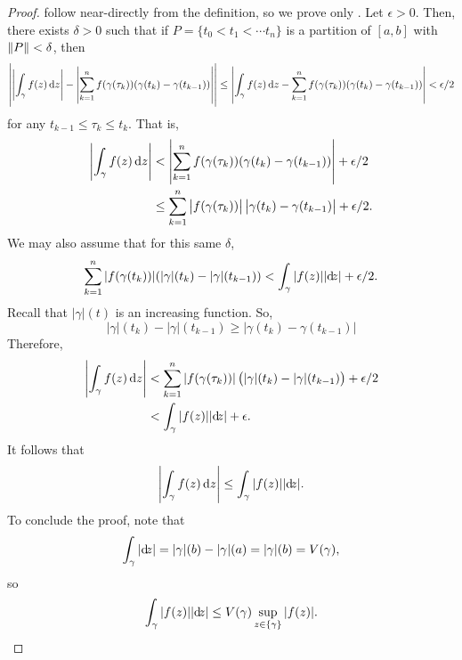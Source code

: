 	\begin{proof}
		 follow near-directly from the definition, so we prove only . Let $\epsilon > 0$. Then, there exists $\delta > 0$ such that if $P = \{ t_0 < t_1 < \cdots t_n \}$ is a partition of $[a,b]$ with $\left\lVert P\right\rVert < \delta$, then
		\[ \left| \left| \int_\gamma f(z) \dif z \right| - \left| \sum_{k=1}^n f(\gamma(\tau_k)) (\gamma(t_k) - \gamma(t_{k-1})) \right| \right| \le \left| \int_\gamma f(z) \dif z - \sum_{k=1}^n f(\gamma(\tau_k)) (\gamma(t_k) - \gamma(t_{k-1})) \right| < \epsilon/2 \]
		for any $t_{k-1} \le \tau_k \le t_k$.
		That is,
		\begin{align*}
			\left| \int_\gamma f(z) \dif z \right| &< \left| \sum_{k=1}^n f(\gamma(\tau_k)) (\gamma(t_k) - \gamma(t_{k-1})) \right| + \epsilon/2 \\
			&\le  \sum_{k=1}^n \left| f(\gamma(\tau_k)) \right| \left|\gamma(t_k) - \gamma(t_{k-1}) \right| + \epsilon/2.
		\end{align*}
		We may also assume that for this same $\delta$,
		\[ \sum_{k=1}^n |f(\gamma(t_k))| (|\gamma|(t_k) - |\gamma|(t_{k-1})) < \int_\gamma |f(z)| |{\dif} {z}| + \epsilon/2 . \]
		Recall that $|\gamma|(t)$ is an increasing function. So,
		\[ |\gamma|(t_k) - |\gamma|(t_{k-1}) \ge |\gamma(t_k) - \gamma(t_{k-1})| \]
		Therefore,
		\begin{align*}
			\left| \int_\gamma f(z) \dif z \right| &< \sum_{k=1}^n |f(\gamma(\tau_k))| \left( |\gamma|(t_k) - |\gamma|(t_{k-1}) \right) + \epsilon/2 \\
				&< \int_\gamma |f(z)| |{\dif} {z}| + \epsilon.
		\end{align*}
		It follows that
		\[ \left| \int_\gamma f(z) \dif z \right| \le \int_\gamma |f(z)| |{\dif} {z}|. \]
		To conclude the proof, note that
		\[ \int_\gamma |{\dif} {z}| = |\gamma|(b) - |\gamma|(a) = |\gamma|(b) = V(\gamma), \]
		so
		\[ \int_\gamma |f(z)| |{\dif} {z}| \le V(\gamma) \sup_{z \in \{\gamma\}} |f(z)|. \]
	\end{proof}

